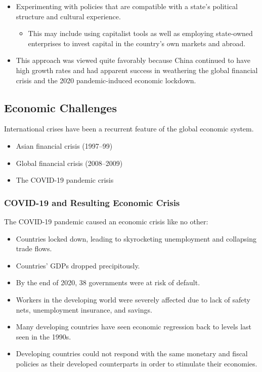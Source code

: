 \documentclass[
]{book}
\providecommand{\tightlist}{%
  \setlength{\itemsep}{0pt}\setlength{\parskip}{0pt}}
\begin{document}
\begin{itemize}
\tightlist
\item
  Experimenting with policies that are compatible with a state's political structure and cultural experience.

  \begin{itemize}
  \tightlist
  \item
    This may include using capitalist tools as well as employing state-owned enterprises to invest capital in the country's own markets and abroad.
  \end{itemize}
\item
  This approach was viewed quite favorably because China continued to have high growth rates and had apparent success in weathering the global financial crisis and the 2020 pandemic-induced economic lockdown.
\end{itemize}

\hypertarget{economic-challenges}{%
\subsection{Economic Challenges}\label{economic-challenges}}

International crises have been a recurrent feature of the global economic system.

\begin{itemize}
\item
  Asian financial crisis (1997--99)
\item
  Global financial crisis (2008--2009)
\item
  The COVID-19 pandemic crisis
\end{itemize}

\hypertarget{covid-19-and-resulting-economic-crisis}{%
\subsubsection{COVID-19 and Resulting Economic Crisis}\label{covid-19-and-resulting-economic-crisis}}

The COVID-19 pandemic caused an economic crisis like no other:

\begin{itemize}
\item
  Countries locked down, leading to skyrocketing unemployment and collapsing trade flows.
\item
  Countries' GDPs dropped precipitously.
\item
  By the end of 2020, 38 governments were at risk of default.
\item
  Workers in the developing world were severely affected due to lack of safety nets, unemployment insurance, and savings.
\item
  Many developing countries have seen economic regression back to levels last seen in the 1990s.
\item
  Developing countries could not respond with the same monetary and fiscal policies as their developed counterparts in order to stimulate their economies.
\end{itemize}
\end{document}
